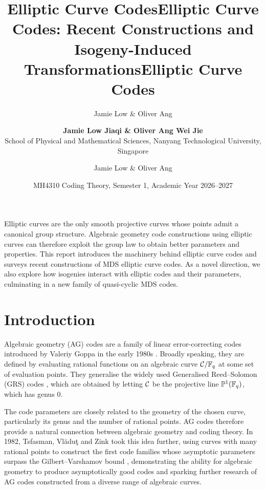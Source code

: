 \documentclass[twocolumn, 11pt]{scrartcl}
\title{Elliptic Curve Codes}
\author{Jamie Low \& Oliver Ang}
\begin{document}
\title{\textbf{Elliptic Curve Codes: Recent Constructions and Isogeny-Induced Transformations}}
\author{\textbf{Jamie Low Jiaqi \& Oliver Ang Wei Jie}\\School of Physical and Mathematical Sciences, Nanyang Technological University, Singapore}
\date{MH4310 Coding Theory, Semester 1, Academic Year 2026--2027}
\maketitle

\title{Elliptic Curve Codes}
\author{Jamie Low \& Oliver Ang}
\date{}


Elliptic curves are the only smooth projective curves whose points admit a canonical group structure. Algebraic geometry code constructions using elliptic curves can therefore exploit the group law to obtain better parameters and properties. This report introduces the machinery behind elliptic curve codes and surveys recent constructions of MDS elliptic curve codes. As a novel direction, we also explore how isogenies interact with elliptic codes and their parameters, culminating in a new family of quasi-cyclic MDS codes.

\section{Introduction} \label{section:introduction}

Algebraic geometry (AG) codes are a family of linear error-correcting codes introduced by Valeriy Goppa in the early 1980s \cite{goppa1983algebraico}. Broadly speaking, they are defined by evaluating rational functions on an algebraic curve $\mathcal{C}/\mathbb{F}_q$ at some set of evaluation points. They generalise the widely used Generalised Reed--Solomon (GRS) codes \cite{macwilliams1977theory}, which are obtained by letting $\mathcal{C}$ be the projective line $\mathbb{P}^1(\mathbb{F}_q)$, which has genus 0.

The code parameters are closely related to the geometry of the chosen curve, particularly its genus and the number of rational points. AG codes therefore provide a natural connection between algebraic geometry and coding theory. In 1982, Tsfasman, Vl\u{a}du\c{t} and Zink took this idea further, using curves with many rational points to construct the first code families whose asymptotic parameters surpass the Gilbert--Varshamov bound \cite{tsfasman1982modular}, demonstrating the ability for algebraic geometry to produce asymptotically good codes and sparking further research of AG codes constructed from a diverse range of algebraic curves.
\end{document}
